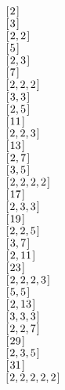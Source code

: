 \documentclass{scrreprt}
\begin{document}
\begin{minipage}{\textwidth}
\ensuremath{[\mskip1.5mu \mathrm{2}\mskip1.5mu]}\\
\ensuremath{[\mskip1.5mu \mathrm{3}\mskip1.5mu]}\\
\ensuremath{[\mskip1.5mu \mathrm{2},\mathrm{2}\mskip1.5mu]}\\
\ensuremath{[\mskip1.5mu \mathrm{5}\mskip1.5mu]}\\
\ensuremath{[\mskip1.5mu \mathrm{2},\mathrm{3}\mskip1.5mu]}\\
\ensuremath{[\mskip1.5mu \mathrm{7}\mskip1.5mu]}\\
\ensuremath{[\mskip1.5mu \mathrm{2},\mathrm{2},\mathrm{2}\mskip1.5mu]}\\
\ensuremath{[\mskip1.5mu \mathrm{3},\mathrm{3}\mskip1.5mu]}\\
\ensuremath{[\mskip1.5mu \mathrm{2},\mathrm{5}\mskip1.5mu]}\\
\ensuremath{[\mskip1.5mu \mathrm{11}\mskip1.5mu]}\\
\ensuremath{[\mskip1.5mu \mathrm{2},\mathrm{2},\mathrm{3}\mskip1.5mu]}\\
\ensuremath{[\mskip1.5mu \mathrm{13}\mskip1.5mu]}\\
\ensuremath{[\mskip1.5mu \mathrm{2},\mathrm{7}\mskip1.5mu]}\\
\ensuremath{[\mskip1.5mu \mathrm{3},\mathrm{5}\mskip1.5mu]}\\
\ensuremath{[\mskip1.5mu \mathrm{2},\mathrm{2},\mathrm{2},\mathrm{2}\mskip1.5mu]}\\
\ensuremath{[\mskip1.5mu \mathrm{17}\mskip1.5mu]}\\
\ensuremath{[\mskip1.5mu \mathrm{2},\mathrm{3},\mathrm{3}\mskip1.5mu]}\\
\ensuremath{[\mskip1.5mu \mathrm{19}\mskip1.5mu]}\\
\ensuremath{[\mskip1.5mu \mathrm{2},\mathrm{2},\mathrm{5}\mskip1.5mu]}\\
\ensuremath{[\mskip1.5mu \mathrm{3},\mathrm{7}\mskip1.5mu]}\\
\ensuremath{[\mskip1.5mu \mathrm{2},\mathrm{11}\mskip1.5mu]}\\
\ensuremath{[\mskip1.5mu \mathrm{23}\mskip1.5mu]}\\
\ensuremath{[\mskip1.5mu \mathrm{2},\mathrm{2},\mathrm{2},\mathrm{3}\mskip1.5mu]}\\
\ensuremath{[\mskip1.5mu \mathrm{5},\mathrm{5}\mskip1.5mu]}\\
\ensuremath{[\mskip1.5mu \mathrm{2},\mathrm{13}\mskip1.5mu]}\\
\ensuremath{[\mskip1.5mu \mathrm{3},\mathrm{3},\mathrm{3}\mskip1.5mu]}\\
\ensuremath{[\mskip1.5mu \mathrm{2},\mathrm{2},\mathrm{7}\mskip1.5mu]}\\
\ensuremath{[\mskip1.5mu \mathrm{29}\mskip1.5mu]}\\
\ensuremath{[\mskip1.5mu \mathrm{2},\mathrm{3},\mathrm{5}\mskip1.5mu]}\\
\ensuremath{[\mskip1.5mu \mathrm{31}\mskip1.5mu]}\\
\ensuremath{[\mskip1.5mu \mathrm{2},\mathrm{2},\mathrm{2},\mathrm{2},\mathrm{2}\mskip1.5mu]}
\end{minipage}
\end{document}
